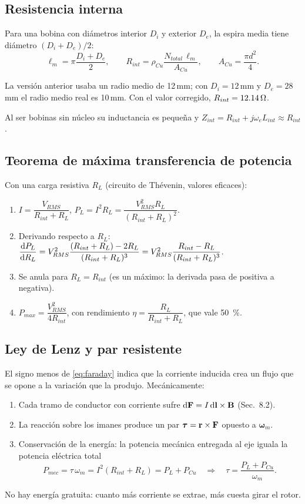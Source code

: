 \documentclass[11pt]{article}
\begin{document}
\subsection{Resistencia interna}
Para una bobina con diámetros interior $D_i$ y exterior $D_e$, la espira media tiene diámetro $(D_i+D_e)/2$:
\begin{equation}
  \ell_m=\pi\frac{D_i+D_e}{2},\qquad R_{int}=\rho_{Cu}\frac{N_{total}\,\ell_m}{A_{Cu}},\qquad A_{Cu}=\frac{\pi d^2}{4}.
\end{equation}
\begin{nota}[Corrección]
La versión anterior usaba un radio medio de 12\,mm; con $D_i=12$\,mm y $D_e=28$\,mm el radio medio real es
10\,mm. Con el valor corregido, $R_{int}=12.14\,\Omega$.
\end{nota}
Al ser bobinas sin núcleo su inductancia es pequeña y $Z_{int}=R_{int}+j\omega_eL_{int}\approx R_{int}$.

\subsection{Teorema de máxima transferencia de potencia}
Con una carga resistiva $R_L$ (circuito de Thévenin, valores eficaces):
\begin{enumerate}
  \item $I=\dfrac{V_{RMS}}{R_{int}+R_L}$, \quad $P_L=I^2R_L=\dfrac{V_{RMS}^2R_L}{(R_{int}+R_L)^2}$.
  \item Derivando respecto a $R_L$:
        $\dfrac{\mathrm{d} P_L}{\mathrm{d} R_L}=V_{RMS}^2\dfrac{(R_{int}+R_L)-2R_L}{(R_{int}+R_L)^3}=V_{RMS}^2\dfrac{R_{int}-R_L}{(R_{int}+R_L)^3}$.
  \item Se anula para $R_L=R_{int}$ (es un máximo: la derivada pasa de positiva a negativa).
  \item $P_{max}=\dfrac{V_{RMS}^2}{4R_{int}}$, con rendimiento $\eta=\dfrac{R_L}{R_{int}+R_L}$, que vale \SI{50}{\percent}.
\end{enumerate}

\subsection{Ley de Lenz y par resistente}
El signo menos de \eqref{eq:faraday} indica que la corriente inducida crea un flujo que se opone a la variación
que la produjo. Mecánicamente:
\begin{enumerate}
  \item Cada tramo de conductor con corriente sufre $\mathrm{d}\mathbf{F}=I\,\mathrm{d}\mathbf{l}\times\mathbf{B}$ (Sec.~8.2).
  \item La reacción sobre los imanes produce un par $\bm\tau=\mathbf{r}\times\mathbf{F}$ opuesto a $\bm\omega_m$.
  \item Conservación de la energía: la potencia mecánica entregada al eje iguala la potencia eléctrica total
        \begin{equation}
          P_{mec}=\tau\,\omega_m=I^2(R_{int}+R_L)=P_L+P_{Cu}\quad\Rightarrow\quad\tau=\frac{P_L+P_{Cu}}{\omega_m}.
        \end{equation}
\end{enumerate}
No hay energía gratuita: cuanto más corriente se extrae, más cuesta girar el rotor.
\end{document}
